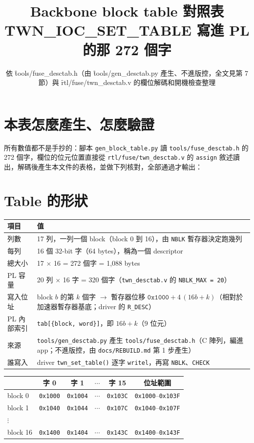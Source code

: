 \documentclass[10pt,a4paper]{article}
\title{Backbone block table 對照表\\[2pt]\large \f{TWN\_IOC\_SET\_TABLE} 寫進 PL 的那 272 個字}
\author{}
\date{依 \f{tools/fuse\_desctab.h}（由 \f{tools/gen\_desctab.py} 產生、不進版控，全文見第 7 節）與 \f{rtl/fuse/twn\_desctab.v} 的欄位解碼和開機檢查整理}
\newcommand{\f}[1]{\texttt{#1}}
\begin{document}
\maketitle
\vspace{-6ex}

\section*{本表怎麼產生、怎麼驗證}
所有數值都不是手抄的：腳本 \f{gen\_block\_table.py} 讀 \f{tools/fuse\_desctab.h} 的 272 個字，欄位的位元位置直接從 \f{rtl/fuse/twn\_desctab.v} 的 \f{assign} 敘述讀出，解碼後產生本文件的表格，並做下列核對，全部通過才輸出：


\section{Table 的形狀}

\begin{tabular}{@{}lL{155mm}@{}}
\toprule
項目 & 值 \\
\midrule
列數 & 17 列，一列一個 block（block 0 到 16），由 \f{NBLK} 暫存器決定跑幾列 \\
每列 & 16 個 32-bit 字（64 bytes），稱為一個 descriptor \\
總大小 & 17 $\times$ 16 = 272 個字 = 1,088 bytes \\
PL 容量 & 20 列 $\times$ 16 字 = 320 個字（\f{twn\_desctab.v} 的 \f{NBLK\_MAX = 20}） \\
寫入位址 & block $b$ 的第 $k$ 個字 $\rightarrow$ 暫存器位移 $\texttt{0x1000} + 4\,(16b + k)$（相對於加速器暫存器基底；driver 的 \f{R\_DESC}） \\
PL 內部索引 & \f{tab[\{block, word\}]}，即 $16b + k$（9 位元） \\
來源 & \f{tools/gen\_desctab.py} 產生 \f{tools/fuse\_desctab.h}（C 陣列，編進 app；不進版控，由 \f{docs/REBUILD.md} 第 1 步產生） \\
誰寫入 & driver \f{twn\_set\_table()} 逐字 \f{writel}，再寫 \f{NBLK}、\f{CHECK} \\
\bottomrule
\end{tabular}

\medskip
\begin{tabular}{@{}lccccc@{}}
\toprule
 & 字 0 & 字 1 & $\cdots$ & 字 15 & 位址範圍 \\
\midrule
block 0  & \f{0x1000} & \f{0x1004} & $\cdots$ & \f{0x103C} & \f{0x1000}--\f{0x103F} \\
block 1  & \f{0x1040} & \f{0x1044} & $\cdots$ & \f{0x107C} & \f{0x1040}--\f{0x107F} \\
$\vdots$ & & & & & \\
block 16 & \f{0x1400} & \f{0x1404} & $\cdots$ & \f{0x143C} & \f{0x1400}--\f{0x143F} \\
\bottomrule
\end{tabular}
\end{document}
